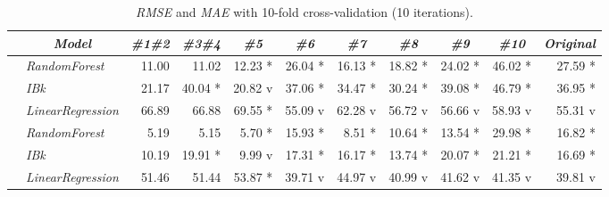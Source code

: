 \documentclass[journal,twoside,web]{ieeecolor}
\begin{document}
\begin{table}[h]
	\begin{center}
		\footnotesize{
 \begin{tabular}{|c|l|r|r|r|r|r|r|r|r|r|}
 \hline
 & \multicolumn{1}{c|}{\textit{\textbf{Model}}} & \multicolumn{1}{c|}{\textit{\textbf{\#1\#2}}} & \multicolumn{1}{c|}{\textit{\textbf{\#3\#4}}} & \multicolumn{1}{c|}{\textit{\textbf{\#5}}} & \multicolumn{1}{c|}{\textit{\textbf{\#6}}} & \multicolumn{1}{c|}{\textit{\textbf{\#7}}} & \multicolumn{1}{c|}{\textit{\textbf{\#8}}} & \multicolumn{1}{c|}{\textit{\textbf{\#9}}} & \multicolumn{1}{c|}{\textit{\textbf{\#10}}} & \multicolumn{1}{c|}{\textit{\textbf{Original}}} \\
 \hline
 \parbox[t]{2mm}{} & \textit{RandomForest}	& 11.00 &   11.02  &    12.23 * &   26.04 * &   16.13 * &   18.82 * &   24.02 * &   46.02 *  &  27.59 * \\
 & \textit{IBk}	& 21.17 &   40.04 * &  20.82 v &   37.06 * &  34.47 *  &  30.24 * &   39.08 * &   46.79 * &   36.95  * \\
 & \textit{LinearRegression}	& 66.89 &    66.88  &    69.55 * &   55.09 v &   62.28 v &   56.72 v &  56.66 v &   58.93 v &   55.31 v \\
 \hline
  \parbox[t]{2mm}{} & \textit{RandomForest}	& 5.19 &     5.15  &     5.70 * &   15.93 *  &   8.51 * &   10.64 * &   13.54 * &   29.98 * &   16.82 * \\
 & \textit{IBk}	& 10.19 &    19.91 * &    9.99 v  &  17.31 * &   16.17 * &   13.74 * &   20.07 * &   21.21 *  &  16.69 *\\
 & \textit{LinearRegression}	& 51.46 &    51.44  &    53.87 * &   39.71 v &   44.97 v &   40.99 v &   41.62 v &   41.35 v &   39.81 v\\	
 \hline
 \end{tabular}
	
			}
		\end{center}
		\caption{\textit{RMSE} and \textit{MAE} with 10-fold cross-validation (10 iterations).}
		\label{RMCV}
	\end{table}




			
		
\end{document}
